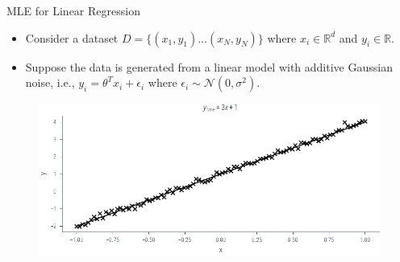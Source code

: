 \documentclass{beamer}
\begin{document}

    \begin{frame}{MLE for Linear Regression}
        \begin{itemize}
            \item Consider a dataset $D = \{ (x_1, y_1) ... (x_N, y_N) \}$ where $x_i \in \mathbb{R}^d$ and $y_i \in \mathbb{R}$.
            \item Suppose the data is generated from a linear model with additive Gaussian noise, i.e., $y_i = \theta^T x_i + \epsilon_i$ where $\epsilon_i \sim \mathcal{N}(0, \sigma^2)$.
        \end{itemize}
        \begin{figure}
            \centerline{\includegraphics[scale = 0.75]{../figures/map/linreg_data.pdf}}
        \end{figure}
        
    \end{frame}
\end{document}
